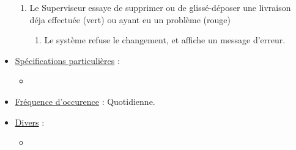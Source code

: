 \documentclass[a4paper]{report}
\begin{document}
\begin{itemize}[label = \textbullet, font = \color{orange}]
\begin{enumerate}
    	\item Le Superviseur essaye de supprimer ou de glissé-déposer une livraison déja effectuée (vert) ou ayant eu un problème (rouge)
        	\begin{enumerate}
            	\item Le système refuse le changement, et affiche un message d'erreur.
            \end{enumerate}
    \end{enumerate}
\item \underline{Spécifications particulières} :
	\begin{itemize}[label = \textbullet, font = \color{blue}]
    \item
    \end{itemize}
\item \underline{Fréquence d'occurence} : Quotidienne.
\item \underline{Divers} :
\begin{itemize}[label = \textbullet, font = \color{blue}]
    \item
    \end{itemize}
\end{itemize}
\end{document}

